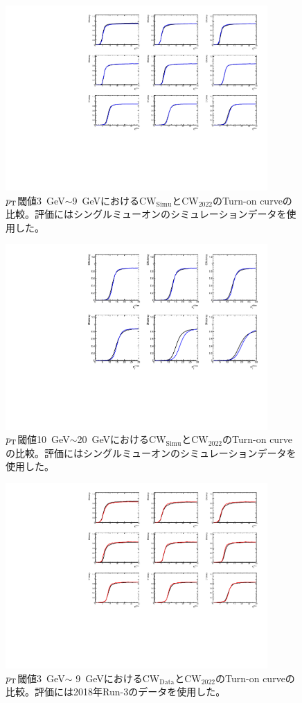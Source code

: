 \begin{figure}[htb]
  \centering
  \includegraphics[clip, width=10cm]{fig/5/v05v07_1_9.pdf}
  \caption{$p_{\rm{T}}$閾値3~GeV$\sim$9~GeVにおける$\mathrm{CW_{Simu}}$と$\mathrm{CW_{2022}}$のTurn-on curveの比較。評価にはシングルミューオンのシミュレーションデータを使用した。}
  \label{fig:v05v07_1_9_Simu}
\end{figure}

\begin{figure}[htb]
  \centering
  \includegraphics[clip, width=10cm]{fig/5/v05v07_10_15.pdf}
  \caption{$p_{\rm{T}}$閾値10~GeV$\sim$20~GeVにおける$\mathrm{CW_{Simu}}$と$\mathrm{CW_{2022}}$のTurn-on curveの比較。評価にはシングルミューオンのシミュレーションデータを使用した。}
  \label{fig:v05v07_12_20_Simu}
\end{figure}

\begin{figure}[htb]
  \centering
  \includegraphics[clip, width=10cm]{fig/5/v05v06_1_9.pdf}
  \caption{$p_{\rm{T}}$閾値3~GeV$\sim$ 9~GeVにおける$\mathrm{CW_{Data}}$と$\mathrm{CW_{2022}}$のTurn-on curveの比較。評価には2018年Run-3のデータを使用した。}
  \label{fig:v05v06_1_9_Data}
\end{figure}

